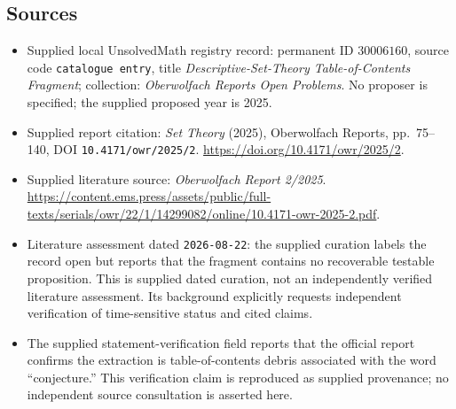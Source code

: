 \documentclass[11pt]{article}
\begin{document}
\subsection{Sources}
\begin{itemize}
\item Supplied local UnsolvedMath registry record: permanent ID \(30006160\), source code \texttt{catalogue entry}, title \emph{Descriptive-Set-Theory Table-of-Contents Fragment}; collection: \emph{Oberwolfach Reports Open Problems}. No proposer is specified; the supplied proposed year is 2025.
\item Supplied report citation: \emph{Set Theory} (2025), Oberwolfach Reports, pp.~75--140, DOI \texttt{10.4171/owr/2025/2}. \url{https://doi.org/10.4171/owr/2025/2}.
\item Supplied literature source: \emph{Oberwolfach Report 2/2025}. \url{https://content.ems.press/assets/public/full-texts/serials/owr/22/1/14299082/online/10.4171-owr-2025-2.pdf}.
\item Literature assessment dated \texttt{2026-08-22}: the supplied curation labels the record open but reports that the fragment contains no recoverable testable proposition. This is supplied dated curation, not an independently verified literature assessment. Its background explicitly requests independent verification of time-sensitive status and cited claims.
\item The supplied statement-verification field reports that the official report confirms the extraction is table-of-contents debris associated with the word ``conjecture.'' This verification claim is reproduced as supplied provenance; no independent source consultation is asserted here.
\end{itemize}
\end{document}
